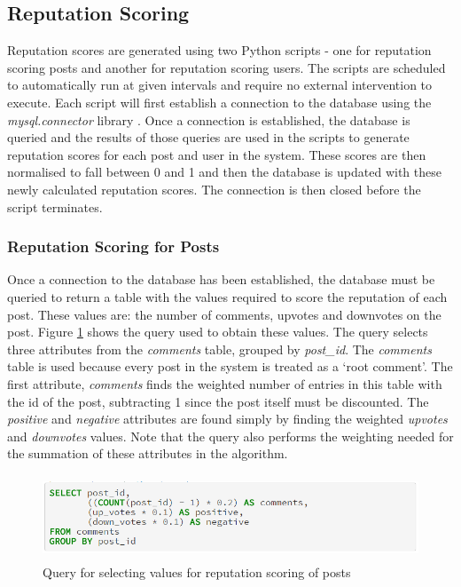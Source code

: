 \subsection{Reputation Scoring}
Reputation scores are generated using two Python scripts - one for reputation scoring posts and another for reputation scoring users. The scripts are scheduled to automatically run at given intervals and require no external intervention to execute. Each script will first establish a connection to the database using the \emph{mysql.connector} library \cite{MySQL:MySQLConnector}. Once a connection is established, the database is queried and the results of those queries are used in the scripts to generate reputation scores for each post and user in the system. These scores are then normalised to fall between 0 and 1 and then the database is updated with these newly calculated reputation scores. The connection is then closed before the script terminates.

\subsubsection{Reputation Scoring for Posts}
Once a connection to the database has been established, the database must be queried to return a table with the values required to score the reputation of each post. These values are: the number of comments, upvotes and downvotes on the post. Figure \ref{fig:PostRepQuery} shows the query used to obtain these values. The query selects three attributes from the \emph{comments} table, grouped by \emph{post\_id}. The \emph{comments} table is used because every post in the system is treated as a `root comment'. The first attribute, \emph{comments} finds the weighted number of entries in this table with the id of the post, subtracting 1 since the post itself must be discounted. The \emph{positive} and \emph{negative} attributes are found simply by finding the weighted \emph{upvotes} and \emph{downvotes} values. Note that the query also performs the weighting needed for the summation of these attributes in the algorithm.

\begin{figure}[H]
\centering
\includegraphics[height=1in]{Images/Implementation/PostRepQuery}
\caption{Query for selecting values for reputation scoring of posts}
\label{fig:PostRepQuery}
\end{figure}


